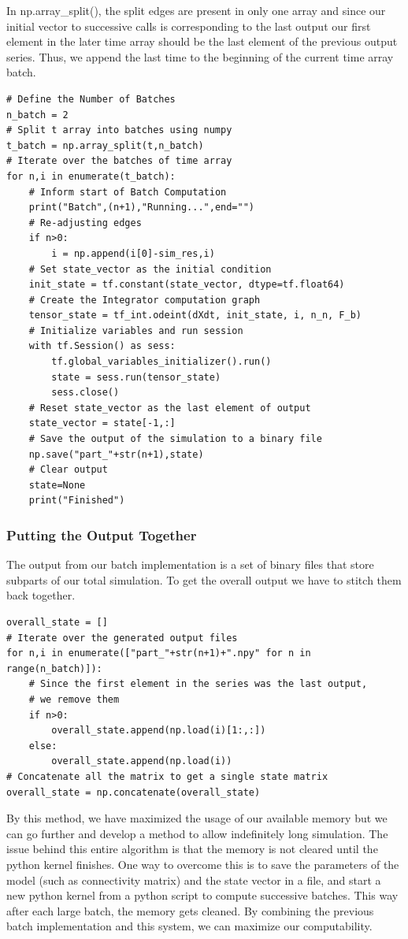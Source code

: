 \documentclass[10pt,letterpaper]{article}
\begin{document}
In np.array\_split(), the split edges are present in only one array and since our initial vector to successive calls is corresponding to the last output our first element in the later time array should be the last element of the previous output series. Thus, we append the last time to the beginning of the current time array batch.

\begin{verbatim}
# Define the Number of Batches
n_batch = 2
# Split t array into batches using numpy
t_batch = np.array_split(t,n_batch)
# Iterate over the batches of time array
for n,i in enumerate(t_batch):
    # Inform start of Batch Computation
    print("Batch",(n+1),"Running...",end="")
    # Re-adjusting edges
    if n>0:
        i = np.append(i[0]-sim_res,i)
    # Set state_vector as the initial condition
    init_state = tf.constant(state_vector, dtype=tf.float64)
    # Create the Integrator computation graph
    tensor_state = tf_int.odeint(dXdt, init_state, i, n_n, F_b)
    # Initialize variables and run session
    with tf.Session() as sess:
        tf.global_variables_initializer().run()
        state = sess.run(tensor_state)
        sess.close()
    # Reset state_vector as the last element of output
    state_vector = state[-1,:]
    # Save the output of the simulation to a binary file
    np.save("part_"+str(n+1),state)
    # Clear output
    state=None
    print("Finished")
\end{verbatim}

\subsubsection*{Putting the Output Together}

The output from our batch implementation is a set of binary files that store subparts of our total simulation. To get the overall output we have to stitch them back together.

\begin{verbatim}
overall_state = []
# Iterate over the generated output files
for n,i in enumerate(["part_"+str(n+1)+".npy" for n in range(n_batch)]):
    # Since the first element in the series was the last output, 
    # we remove them
    if n>0:
        overall_state.append(np.load(i)[1:,:])
    else:
        overall_state.append(np.load(i))
# Concatenate all the matrix to get a single state matrix
overall_state = np.concatenate(overall_state)
\end{verbatim}

By this method, we have maximized the usage of our available memory but we can go further and develop a method to allow indefinitely long simulation. The issue behind this entire algorithm is that the memory is not cleared until the python kernel finishes. One way to overcome this is to save the parameters of the model (such as connectivity matrix) and the state vector in a file, and start a new python kernel from a python script to compute successive batches. This way after each large batch, the memory gets cleaned. By combining the previous batch implementation and this system, we can maximize our computability.
\end{document}
